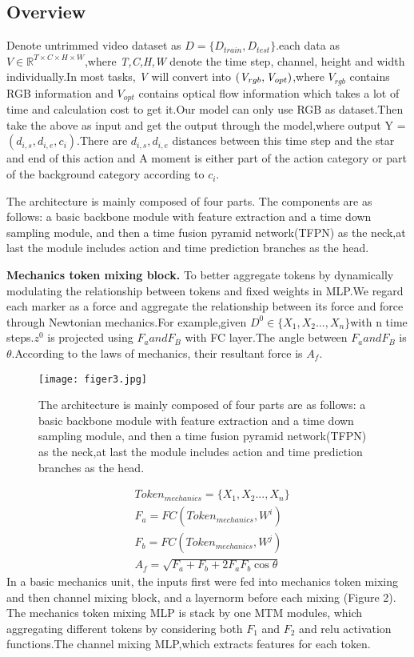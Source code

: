 \documentclass[10pt,twocolumn,letterpaper]{article}
\begin{document}
\subsection{Overview}
Denote untrimmed video dataset as $D = \{D_{train}, D_{test} \} $.each data as $ V\in\mathbb{R}^{T\times C\times H\times W}$,where \emph{T,C,H,W} denote the time step, channel, height and width individually.In most tasks, \emph{V} will convert into ${(\emph{V}_{rgb},\emph{V}_{opt})}$,where ${\textit{V}_{rgb}}$ 
contains RGB information and ${\textit{V}_{opt}}$ contains optical flow information which takes a lot of time and calculation cost to get it.Our model can only use RGB as dataset.Then take the above as input and get the output through the model,where output Y =  ${(d_{i,s}, d_{i,e}, c_i)}$.There are $d_{i,s}, d_{i,e}$ distances between this time step and the star and end of this action and A moment is either part of the action category or part of the background category according to $c_i$.

The architecture is mainly composed of four parts. The components are as follows: a basic backbone module with feature extraction and a time down sampling module, and then a time fusion pyramid network(TFPN) as the neck,at last the module includes action and time prediction branches as the head.



\textbf{Mechanics token mixing block.}
To better aggregate tokens by dynamically modulating the relationship between tokens and fixed weights in MLP.We regard each marker as a force and aggregate the relationship between its force and force through Newtonian mechanics.For example,given $D^0 \in \{X_1,X_2...,X_n\}$with n time steps.$z^0$ is projected using $F_a and F_B$ with FC layer.The angle between $F_a and F_B$ is $\theta$.According to the laws of mechanics, their resultant force is $A_f$.
\begin{figure}
  \center
\texttt{[image: figer3.jpg]}
   \caption{The architecture is mainly composed of four parts are as follows: a basic backbone module with feature extraction and a time down sampling module, and then a time fusion pyramid network(TFPN) as the neck,at last the module includes action and time prediction branches as the head.}
    \label{fig3}
\end{figure}
\begin{equation}
\begin{aligned}
    &Token_{mechanics} = \{X_1,X_2...,X_n\}\\
    &F_a=FC(Token_{mechanics},W^i)\\
    &F_b=FC(Token_{mechanics},W^j)\\
    &A_f = \sqrt{F_a+F_b+2F_aF_b\cos\theta}
\end{aligned}
\end{equation}
In a basic mechanics unit, the inputs first were fed into mechanics token mixing and then channel mixing block, and a layernorm before each mixing (Figure 2). The mechanics token mixing MLP is stack by one MTM modules, which aggregating different tokens by considering both $F_1$ and $F_2$  and relu activation functions.The channel mixing MLP,which extracts features for each token. 
\end{document}
